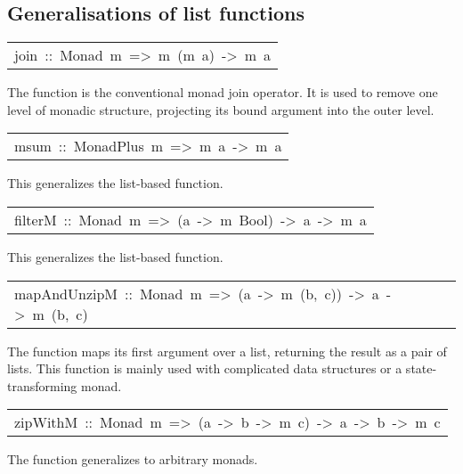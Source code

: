 \subsection{Generalisations of list functions
}
\begin{haddockdesc}
\item[\begin{tabular}{@{}l}
join\ ::\ Monad\ m\ =>\ m\ (m\ a)\ ->\ m\ a
\end{tabular}]\haddockbegindoc
The  function is the conventional monad join operator. It is used to
 remove one level of monadic structure, projecting its bound argument into the
 outer level.
\par

\end{haddockdesc}
\begin{haddockdesc}
\item[\begin{tabular}{@{}l}
msum\ ::\ MonadPlus\ m\ =>\ {\char 91}m\ a{\char 93}\ ->\ m\ a
\end{tabular}]\haddockbegindoc
This generalizes the list-based  function.
\par

\end{haddockdesc}
\begin{haddockdesc}
\item[\begin{tabular}{@{}l}
filterM\ ::\ Monad\ m\ =>\ (a\ ->\ m\ Bool)\ ->\ {\char 91}a{\char 93}\ ->\ m\ {\char 91}a{\char 93}
\end{tabular}]\haddockbegindoc
This generalizes the list-based  function.
\par

\end{haddockdesc}
\begin{haddockdesc}
\item[\begin{tabular}{@{}l}
mapAndUnzipM\ ::\ Monad\ m\ =>\ (a\ ->\ m\ (b,\ c))\ ->\ {\char 91}a{\char 93}\ ->\ m\ ({\char 91}b{\char 93},\ {\char 91}c{\char 93})
\end{tabular}]\haddockbegindoc
The  function maps its first argument over a list, returning
 the result as a pair of lists. This function is mainly used with complicated
 data structures or a state-transforming monad.
\par

\end{haddockdesc}
\begin{haddockdesc}
\item[\begin{tabular}{@{}l}
zipWithM\ ::\ Monad\ m\ =>\ (a\ ->\ b\ ->\ m\ c)\ ->\ {\char 91}a{\char 93}\ ->\ {\char 91}b{\char 93}\ ->\ m\ {\char 91}c{\char 93}
\end{tabular}]\haddockbegindoc
The  function generalizes  to arbitrary monads.
\par

\end{haddockdesc}
